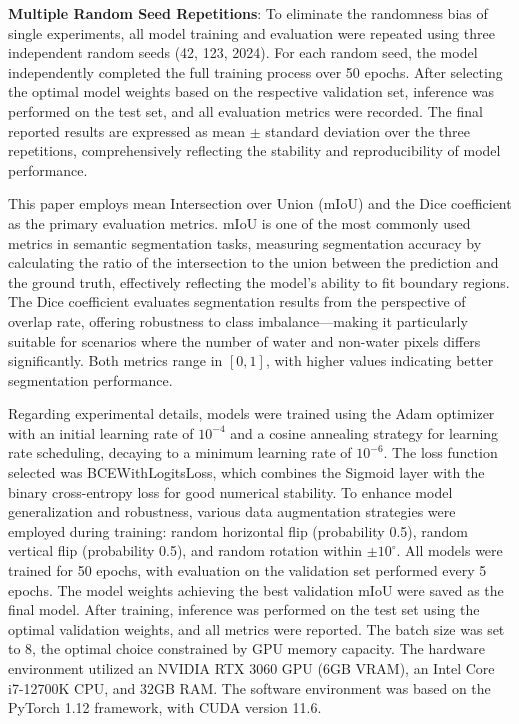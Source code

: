 \documentclass[lettersize,journal]{IEEEtran}
\begin{document}
\textbf{Multiple Random Seed Repetitions}: To eliminate the randomness bias of single experiments, all model training and evaluation were repeated using three independent random seeds (42, 123, 2024). For each random seed, the model independently completed the full training process over 50 epochs. After selecting the optimal model weights based on the respective validation set, inference was performed on the test set, and all evaluation metrics were recorded. The final reported results are expressed as mean $\pm$ standard deviation over the three repetitions, comprehensively reflecting the stability and reproducibility of model performance.

This paper employs mean Intersection over Union (mIoU) and the Dice coefficient as the primary evaluation metrics. mIoU is one of the most commonly used metrics in semantic segmentation tasks, measuring segmentation accuracy by calculating the ratio of the intersection to the union between the prediction and the ground truth, effectively reflecting the model's ability to fit boundary regions. The Dice coefficient evaluates segmentation results from the perspective of overlap rate, offering robustness to class imbalance---making it particularly suitable for scenarios where the number of water and non-water pixels differs significantly. Both metrics range in $[0,1]$, with higher values indicating better segmentation performance.

Regarding experimental details, models were trained using the Adam optimizer with an initial learning rate of $10^{-4}$ and a cosine annealing strategy for learning rate scheduling, decaying to a minimum learning rate of $10^{-6}$. The loss function selected was BCEWithLogitsLoss, which combines the Sigmoid layer with the binary cross-entropy loss for good numerical stability. To enhance model generalization and robustness, various data augmentation strategies were employed during training: random horizontal flip (probability 0.5), random vertical flip (probability 0.5), and random rotation within $\pm10^\circ$. All models were trained for 50 epochs, with evaluation on the validation set performed every 5 epochs. The model weights achieving the best validation mIoU were saved as the final model. After training, inference was performed on the test set using the optimal validation weights, and all metrics were reported. The batch size was set to 8, the optimal choice constrained by GPU memory capacity. The hardware environment utilized an NVIDIA RTX 3060 GPU (6GB VRAM), an Intel Core i7-12700K CPU, and 32GB RAM. The software environment was based on the PyTorch 1.12 framework, with CUDA version 11.6.
\end{document}
